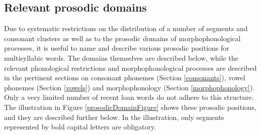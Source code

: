 \subsection{Relevant prosodic domains}\label{prosodicDomains}
Due to systematic restrictions on the distribution of a number of segments and consonant clusters as well as to the prosodic domains of morphophonological processes, it is useful to name and describe various prosodic positions for multisyllabic words. The domains themselves are described below, while the relevant phonological restrictions and morphophonological processes are described in the pertinent sections on consonant phonemes (Section \ref{consonants}), vowel phonemes (Section \ref{vowels}) and morphophonology (Section \ref{morphophonology}). Only a very limited number of recent loan words do not adhere to this structure. 
The illustration in Figure \vref{prosodicDomainFigure} shows these prosodic positions, and they are described further below. In the illustration, only segments represented by bold capital letters are obligatory.
\newcommand{\Cyes}{{\fontspec{Arial}\Bf{C}}}
\newcommand{\Cno}{{\fontspec{Arial}c}}
\newcommand{\Vyes}{{\fontspec{Arial}\Bf{V}}}
\newcommand{\Vno}{{\fontspec{Arial}v}}
